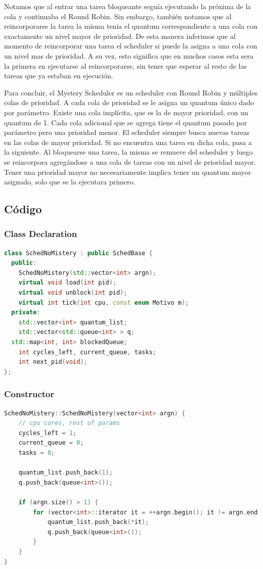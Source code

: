 Notamos que al entrar una tarea bloqueante seguía ejecutando la próxima de la cola y continuaba el Round Robin. Sin embargo, también notamos que al reincorporarse la tarea la misma tenia el quantum correspondiente a una cola con exactamente un nivel mayor de prioridad. De esta manera inferimos que al momento de reincorporar una tarea el scheduler si puede la asigna a una cola con un nivel mas de prioridad. A su vez, esto significa que en muchos casos esta sera la primera en ejecutarse al reincorporarse, sin tener que esperar al resto de las tareas que ya estaban en ejecución.

\hspace{1px}

Para concluir, el Mystery Scheduler es un scheduler con Round Robin y múltiples colas de prioridad. A cada cola de prioridad se le asigna un quantum único dado por parámetro. Existe una cola implícita, que es la de mayor prioridad, con un quantum de 1. Cada cola adicional que se agrega tiene el quantum pasado por parámetro pero una prioridad menor. El scheduler siempre busca nuevas tareas en las colas de mayor prioridad. Si no encuentra una tarea en dicha cola, pasa a la siguiente.  Al bloquearse una tarea, la misma se remueve del scheduler y luego se reincorpora agregándose a una cola de tareas con un nivel de prioridad mayor. Tener una prioridad mayor no necesariamente implica tener un quantum mayor asignado, solo que se la ejecutara primero.

\pagebreak

\subsection{Código}

\subsubsection{Class Declaration}
\begin{lstlisting}[language=C++, breaklines=true]
class SchedNoMistery : public SchedBase {
  public:
    SchedNoMistery(std::vector<int> argn);
    virtual void load(int pid);
    virtual void unblock(int pid);
    virtual int tick(int cpu, const enum Motivo m);
  private:
	std::vector<int> quantum_list;
	std::vector<std::queue<int> > q;
  std::map<int, int> blockedQueue;
	int cycles_left, current_queue, tasks;
	int next_pid(void);
};
\end{lstlisting}


\subsubsection{Constructor}
\begin{lstlisting}[language=C++, breaklines=true]
SchedNoMistery::SchedNoMistery(vector<int> argn) {
	// cpu cores, rest of params
	cycles_left = 1;
	current_queue = 0;
	tasks = 0;

	quantum_list.push_back(1);
	q.push_back(queue<int>());

	if (argn.size() > 1) {
		for (vector<int>::iterator it = ++argn.begin(); it != argn.end(); ++it) {
			quantum_list.push_back(*it);
			q.push_back(queue<int>());
		}
	}
}
\end{lstlisting}



